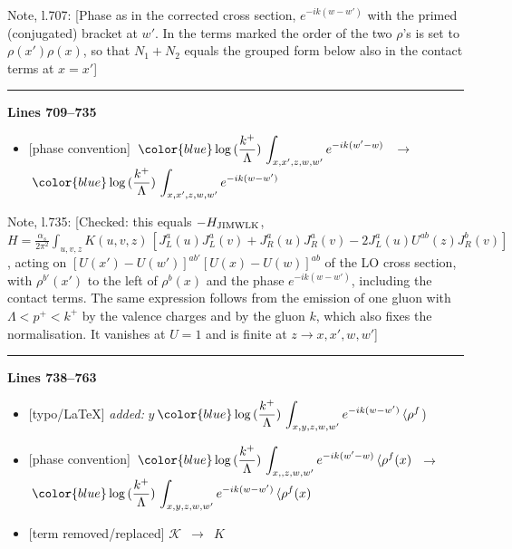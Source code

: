 \documentclass[10pt]{article}
\newenvironment{notebox}{\def\FrameCommand{{\color{notebar}\vrule width 1.5pt}\hspace{6pt}}\MakeFramed{\advance\hsize-\width\FrameRestore}\small}{\endMakeFramed}
\begin{document}
\begin{notebox}\textsf{\small Note, l.707:} [Phase as in the corrected cross section, $e^{-ik(w-w')}$ with the primed (conjugated) bracket at $w'$. In the terms marked the order of the two $\rho$'s is set to $\rho(x')\rho(x)$, so that $N_{1}+N_{2}$ equals the grouped form below also in the contact terms at $x=x'$]\end{notebox}
\noindent\rule{\linewidth}{0.3pt}\par\noindent\textbf{Lines 709--735} \par
\begin{itemize}[leftmargin=2.2em,itemsep=1pt,topsep=2pt]
\item[\textbf{l.709}] \textsf{\small [phase convention]} $\displaystyle \,{\color{blue}\log{(\frac{k^{+}}{\Lambda})}}\,\int_{x,x',z,w,w'}e^{-ik(w'-w)}\,$\ $\longrightarrow$\ $\displaystyle \,{\color{blue}\log{(\frac{k^{+}}{\Lambda})}}\,\int_{x,x',z,w,w'}e^{-ik(w-w')}\,$
\end{itemize}
\begin{notebox}\textsf{\small Note, l.735:} [Checked: this equals $-H_{\rm JIMWLK}$, $H=\frac{\alpha_s}{2\pi^{2}}\int_{u,v,z}K(u,v,z)\,[J^{a}_{L}(u)J^{a}_{L}(v)+J^{a}_{R}(u)J^{a}_{R}(v)-2J^{a}_{L}(u)U^{ab}(z)J^{b}_{R}(v)]$, acting on $[U(x')-U(w')]^{ab'}[U(x)-U(w)]^{ab}$ of the LO cross section, with $\rho^{b'}(x')$ to the left of $\rho^{b}(x)$ and the phase $e^{-ik(w-w')}$, including the contact terms. The same expression follows from the emission of one gluon with $\Lambda<p^{+}<k^{+}$ by the valence charges and by the gluon $k$, which also fixes the normalisation. It vanishes at $U=1$ and is finite at $z\to x,x',w,w'$]\end{notebox}
\noindent\rule{\linewidth}{0.3pt}\par\noindent\textbf{Lines 738--763} \par
\begin{itemize}[leftmargin=2.2em,itemsep=1pt,topsep=2pt]
\item[\textbf{l.738}] \textsf{\small [typo/LaTeX]} \emph{added:} $\displaystyle y$$\displaystyle \,{\color{blue}\log{(\frac{k^{+}}{\Lambda})}}\,\int_{x,y,z,w,w'}e^{-ik(w-w')}\,\langle\rho^{f}${\color{gray}\small)}
\item[\textbf{l.738}] \textsf{\small [phase convention]} $\displaystyle \,{\color{blue}\log{(\frac{k^{+}}{\Lambda})}}\,\int_{x,,z,w,w'}e^{-ik(w'-w)}\,\langle\rho^{f}(x)$\ $\longrightarrow$\ $\displaystyle \,{\color{blue}\log{(\frac{k^{+}}{\Lambda})}}\,\int_{x,y,z,w,w'}e^{-ik(w-w')}\,\langle\rho^{f}(x)$
\item[\textbf{l.763}] \textsf{\small [term removed/replaced]} $\displaystyle \mathcal{K}$\ $\longrightarrow$\ $\displaystyle K$
\end{itemize}
\end{document}
